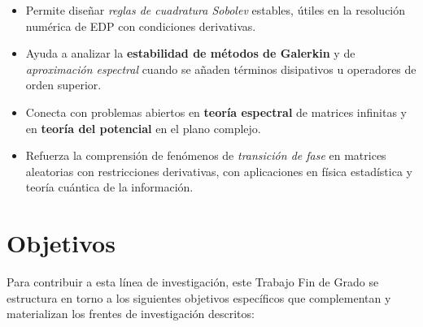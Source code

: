 \begin{itemize}
	\item Permite diseñar \emph{reglas de cuadratura Sobolev} estables, útiles en la resolución numérica de EDP con condiciones derivativas.
	\item Ayuda a analizar la \textbf{estabilidad de métodos de Galerkin} y de \emph{aproximación espectral} cuando se añaden términos disipativos u operadores de orden superior.
	\item Conecta con problemas abiertos en \textbf{teoría espectral} de matrices infinitas y en \textbf{teoría del potencial} en el plano complejo.
	\item Refuerza la comprensión de fenómenos de \emph{transición de fase} en matrices aleatorias con restricciones derivativas, con aplicaciones en física estadística y teoría cuántica de la información.
\end{itemize}

\section{Objetivos}

Para contribuir a esta línea de investigación, este Trabajo Fin de Grado se estructura en torno a los siguientes objetivos específicos que complementan y materializan los frentes de investigación descritos:

